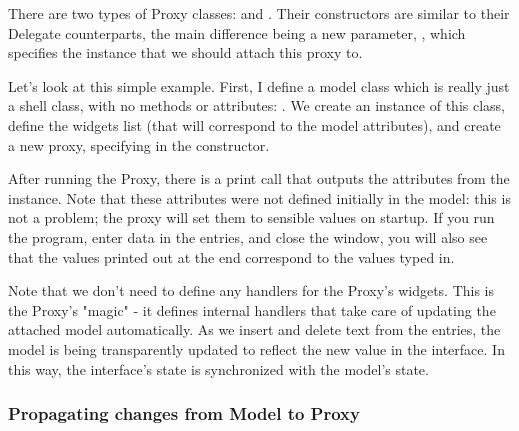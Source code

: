 \documentclass[a4paper]{howto}
\begin{document}
There are two types of Proxy classes:  and
. Their constructors are similar to their Delegate
counterparts, the main difference being a new parameter, ,
which specifies the instance that we should attach this proxy to.





Let's look at this simple example. First, I define a model class which
is really just a shell class, with no methods or attributes:
. We create an instance of this class, define the
widgets list (that will correspond to the model attributes), and create
a new proxy, specifying  in the constructor.

After running the Proxy, there is a print call that outputs the
attributes from the  instance. Note that these attributes
were not defined initially in the model: this is not a problem; the
proxy will set them to sensible values on startup. If you run the
program, enter data in the entries, and close the window, you will also
see that the values printed out at the end correspond to the values
typed in.

Note that we don't need to define any handlers for the Proxy's widgets.
This is the Proxy's "magic" - it defines internal handlers that take
care of updating the attached model automatically. As we insert and
delete text from the entries, the model is being transparently updated
to reflect the new value in the interface. In this way, the interface's
state is synchronized with the model's state.

\subsubsection{Propagating changes from Model to Proxy}
\end{document}
